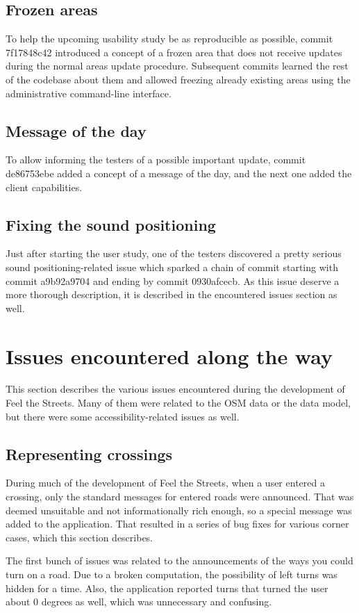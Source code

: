 \documentclass[nolof,digital]{fithesis3}
\begin{document}
\subsection{Frozen areas}
To help the upcoming usability study be as reproducible as possible, commit 7f17848c42 introduced a concept of a frozen area that does not receive updates during the normal areas update procedure. Subsequent commits learned the rest of the codebase about them and allowed freezing already existing areas using the administrative command-line interface.
\subsection{Message of the day}
To allow informing the testers of a possible important update, commit de86753ebe added a concept of a message of the day, and the next one added the client capabilities.
\subsection{Fixing the sound positioning}
Just after starting the user study, one of the testers discovered a pretty serious sound positioning-related issue which sparked a chain of commit starting with commit a9b92a9704 and ending by commit 0930afcecb. As this issue deserve a more thorough description, it is described in the encountered issues section as well.
\section{Issues encountered along the way}
This section describes the various issues encountered during the development of Feel the Streets. Many of them were related to the OSM data or the data model, but there were some accessibility-related issues as well.
\subsection{Representing crossings} \label{ref:crossings}
During much of the development of Feel the Streets, when a user entered a crossing, only the standard messages for entered roads were announced. That was deemed unsuitable and not informationally rich enough, so a special message was added to the application. That resulted in a series of bug fixes for various corner cases, which this section describes.

The first bunch of issues was related to the announcements of the ways you could turn on a road. Due to a broken computation, the possibility of left turns was hidden for a time. Also, the application reported turns that turned the user about 0 degrees as well, which was unnecessary and confusing.
\end{document}
